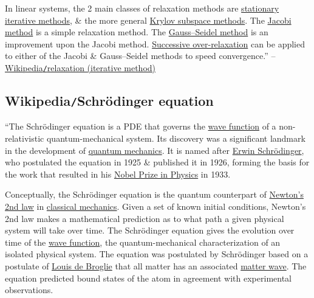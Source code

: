 \documentclass{article}
\begin{document}
In linear systems, the 2 main classes of relaxation methods are \href{https://en.wikipedia.org/wiki/Iterative_method#Stationary_iterative_methods}{stationary iterative methods}, \& the more general \href{https://en.wikipedia.org/wiki/Iterative_method#Krylov_subspace_methods}{Krylov subspace methods}. The \href{https://en.wikipedia.org/wiki/Jacobi_method}{Jacobi method} is a simple relaxation method. The \href{https://en.wikipedia.org/wiki/Gauss%E2%80%93Seidel_method}{Gauss--Seidel method} is an improvement upon the Jacobi method. \href{https://en.wikipedia.org/wiki/Successive_over-relaxation}{Successive over-relaxation} can be applied to either of the Jacobi \& Gauss--Seidel methods to speed convergence.'' -- \href{https://en.wikipedia.org/wiki/Relaxation_(iterative_method)}{Wikipedia{\tt/}relaxation (iterative method)}


\subsection{Wikipedia{\tt/}Schrödinger equation}
``The {\sc Schrödinger equation} is a PDE that governs the \href{https://en.wikipedia.org/wiki/Wave_function}{wave function} of a non-relativistic quantum-mechanical system. Its discovery was a significant landmark in the development of \href{https://en.wikipedia.org/wiki/Quantum_mechanics}{quantum mechanics}. It is named after \href{https://en.wikipedia.org/wiki/Erwin_Schr%C3%B6dinger}{\sc Erwin Schr\"odinger}, who postulated the equation in 1925 \& published it in 1926, forming the basis for the work that resulted in his \href{https://en.wikipedia.org/wiki/Nobel_Prize_in_Physics}{Nobel Prize in Physics} in 1933.

Conceptually, the Schrödinger equation is the quantum counterpart of \href{https://en.wikipedia.org/wiki/Newton%27s_second_law}{Newton's 2nd law} in \href{https://en.wikipedia.org/wiki/Classical_mechanics}{classical mechanics}. Given a set of known initial conditions, Newton's 2nd law makes a mathematical prediction as to what path a given physical system will take over time. The Schrödinger equation gives the evolution over time of the \href{https://en.wikipedia.org/wiki/Wave_function}{wave function}, the quantum-mechanical characterization of an isolated physical system. The equation was postulated by Schrödinger based on a postulate of \href{https://en.wikipedia.org/wiki/Louis_de_Broglie}{Louis de Broglie} that all matter has an associated \href{https://en.wikipedia.org/wiki/Matter_wave}{matter wave}. The equation predicted bound states of the atom in agreement with experimental observations.
\end{document}

